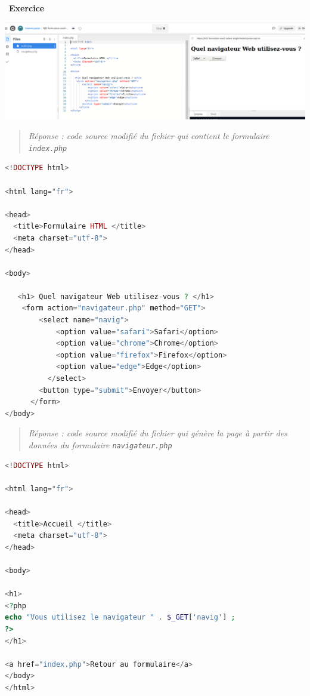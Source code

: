 \documentclass[
  11pt,
]{article}
\newcommand{\passthrough}[1]{#1}
\newcounter{exo}
\newenvironment{exercice}[1]
{\par \medskip   \addtocounter{exo}{1} \noindent  
\begin{bclogo}[arrondi =0.1,   noborder = true, logo=\bccrayon, marge=4]{~\textbf{Exercice} \textbf{\theexo} {\itshape #1} }  \par}
{
\end{bclogo}
 \par \bigskip }
\begin{document}
\begin{exercice}{}
\includegraphics{images/formulaire_replit_select.png}\\

\begin{quote}
\emph{Réponse : code source modifié du fichier qui contient le
formulaire \passthrough{\lstinline!index.php!}}
\end{quote}

\begin{lstlisting}[language=PHP]
<!DOCTYPE html>

<html lang="fr">

<head>
  <title>Formulaire HTML </title>
  <meta charset="utf-8">    
</head>
 
<body>

   <h1> Quel navigateur Web utilisez-vous ? </h1>
    <form action="navigateur.php" method="GET">
        <select name="navig">
            <option value="safari">Safari</option>
            <option value="chrome">Chrome</option>
            <option value="firefox">Firefox</option>
            <option value="edge">Edge</option>
          </select> 
        <button type="submit">Envoyer</button>
      </form> 
</body>
\end{lstlisting}

\begin{quote}
\emph{Réponse : code source modifié du fichier qui génère la page à
partir des données du formulaire
\passthrough{\lstinline!navigateur.php!}}
\end{quote}

\begin{lstlisting}[language=PHP]
<!DOCTYPE html>

<html lang="fr">

<head>
  <title>Accueil </title>
  <meta charset="utf-8">    
</head>
 
<body>

<h1>
<?php  
echo "Vous utilisez le navigateur " . $_GET['navig'] ;
?>
</h1>

<a href="index.php">Retour au formulaire</a>
</body>
</html> 
\end{lstlisting}


\end{exercice}
\end{document}
